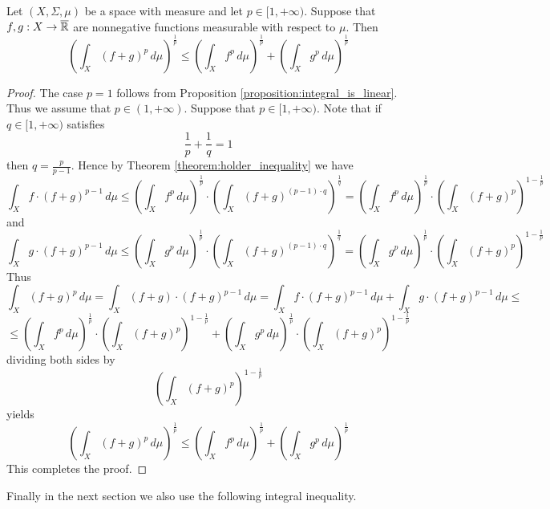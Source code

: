 \begin{corollary}[Minkowski]\label{corollary:Minkowski_inequality}
    Let $(X,\Sigma,\mu)$ be a space with measure and let $p \in [1,+\infty)$. Suppose that $f,g:X\rightarrow \overline{{\mathbb R}}$ are nonnegative functions measurable with respect to $\mu$. Then
    $$\left(\int_X\left(f + g\right)^p\,d\mu\right)^{\frac{1}{p}} \leq \left(\int_X f^p\,d\mu\right)^{\frac{1}{p}} + \left(\int_X g^p\,d\mu\right)^{\frac{1}{p}}$$
\end{corollary}
\begin{proof}
    The case $p = 1$ follows from Proposition \ref{proposition:integral_is_linear}. Thus we assume that $p \in (1,+\infty)$. Suppose that $p \in [1,+\infty)$. Note that if $q \in [1,+\infty)$ satisfies
    $$\frac{1}{p} + \frac{1}{q} = 1$$
    then $q = \frac{p}{p-1}$. Hence by Theorem \ref{theorem:holder_inequality} we have
    $$\int_Xf \cdot \left(f + g\right)^{p-1}\,d\mu \leq \left(\int_X f^p\,d\mu\right)^{\frac{1}{p}}\cdot \left(\int_X\left(f + g\right)^{(p-1)\cdot q}\right)^{\frac{1}{q}} = \left(\int_X f^p\,d\mu\right)^{\frac{1}{p}}\cdot \left(\int_X\left(f + g\right)^{p}\right)^{1 - \frac{1}{p}}$$
    and
    $$\int_Xg \cdot \left(f + g\right)^{p-1}\,d\mu \leq \left(\int_X g^p\,d\mu\right)^{\frac{1}{p}}\cdot \left(\int_X\left(f + g\right)^{(p-1)\cdot q}\right)^{\frac{1}{q}} = \left(\int_X g^p\,d\mu\right)^{\frac{1}{p}}\cdot \left(\int_X\left(f + g\right)^{p}\right)^{1 - \frac{1}{p}}$$
    Thus
    $$\int_X\left(f+g\right)^p\,d\mu = \int_X\left(f + g\right)\cdot \left(f + g\right)^{p-1}\,d\mu = \int_Xf \cdot \left(f + g\right)^{p-1}\,d\mu + \int_Xg\cdot \left(f + g\right)^{p-1}\,d\mu \leq $$
    $$\leq \left(\int_X f^p\,d\mu\right)^{\frac{1}{p}}\cdot \left(\int_X\left(f + g\right)^{p}\right)^{1 - \frac{1}{p}} + \left(\int_X g^p\,d\mu\right)^{\frac{1}{p}}\cdot \left(\int_X\left(f + g\right)^{p}\right)^{1 - \frac{1}{p}}$$
    dividing both sides by
    $$\left(\int_X\left(f + g\right)^{p}\right)^{1 - \frac{1}{p}}$$
    yields
    $$\left(\int_X\left(f + g\right)^p\,d\mu\right)^{\frac{1}{p}} \leq \left(\int_X f^p\,d\mu\right)^{\frac{1}{p}} + \left(\int_X g^p\,d\mu\right)^{\frac{1}{p}}$$
    This completes the proof.
\end{proof}
\noindent
Finally in the next section we also use the following integral inequality.

